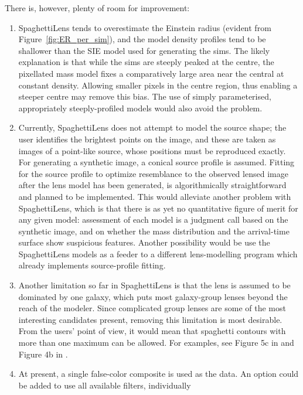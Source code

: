\documentclass[usenatbib]{mn2e}
\newcommand{\spl}{SpaghettiLens\xspace}
\newcommand{\Figref}[1]{Figure~\ref{fig:#1}}
\begin{document}
There is, however, plenty of room for improvement:
\begin{enumerate}
\item \spl tends to overestimate the Einstein radius (evident from
  \Figref{ER_per_sim}), and the model density profiles tend to be
  shallower than the SIE model used for generating the sims.  The
  likely explanation is that while the sims are steeply peaked at the
  centre, the pixellated mass model fixes a comparatively large area
  near the central at constant density. Allowing smaller pixels in the
  centre region, thus enabling a steeper centre \citep[similar to the
    ``high resolution'' feature implemented in][]{2014arXiv1401.7990C}
  may remove this bias.  The use of simply parameterised,
  appropriately steeply-profiled models would also avoid the problem.
\item Currently, \spl does not attempt to model the source shape; the
  user identifies the brightest points on the image, and these are
  taken as images of a point-like source, whose positions must be
  reproduced exactly. For generating a synthetic image, a conical
  source profile is assumed. Fitting for the source profile to
  optimize resemblance to the observed lensed image after the lens
  model has been generated, is algorithmically straightforward
  \citep[cf.][]{2003ApJ...590..673W,2006MNRAS.371..983S} and planned
  to be implemented.  This would alleviate another problem with \spl,
  which is that there is as yet no quantitative figure of merit for
  any given model: assessment of each model is a judgment call based
  on the synthetic image, and on whether the mass distribution and the
  arrival-time surface show suspicious features.  Another possibility
  would be use the \spl models as a feeder to a different
  lens-modelling program which already implements source-profile
  fitting.
\item Another limitation so far in \spl is that the lens is assumed to
  be dominated by one galaxy, which puts most galaxy-group lenses
  beyond the reach of the modeler. Since complicated group lenses are
  some of the most interesting candidates present, removing this
  limitation is most desirable.  From the users' point of view, it
  would mean that spaghetti contours with more than one maximum can be
  allowed.  For examples, see Figure 5c in \citep{2001ApJ...557..594R}
  and Figure 4b in \cite{2003ApJ...590...39K}.
\item At present, a single false-color composite is used as the data.
  An option could be added to use all available filters, individually

\end{enumerate}
\end{document}
